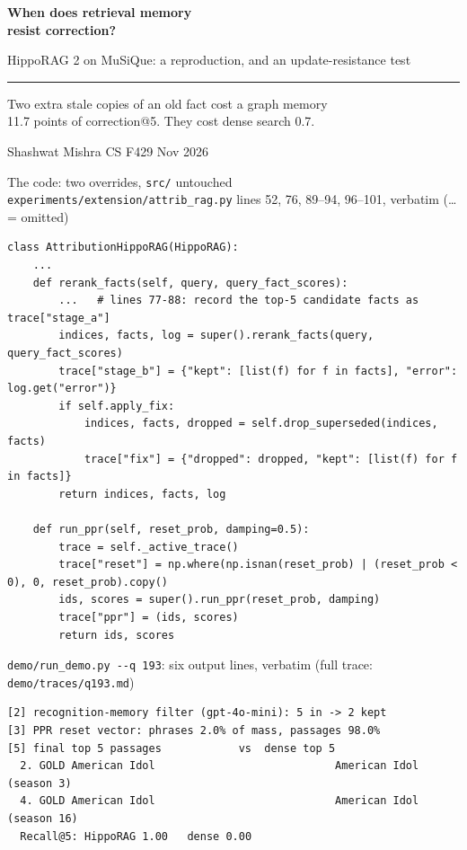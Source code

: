 \documentclass[aspectratio=169,12pt]{beamer}
\newcommand{\quiet}[1]{{\color{muted}\small #1}}
\begin{document}
\begin{frame}
\vspace{2.2em}
{\fontsize{26}{31}\selectfont\bfseries When does retrieval memory\\resist correction?}

\vspace{1.2em}
{\large HippoRAG 2 on MuSiQue: a reproduction, and an update-resistance test}

\vspace{1.6em}
\color{accent}\rule{3em}{0.25em}\color{ink}

\vspace{0.8em}
Two extra stale copies of an old fact cost a graph memory\\
11.7 points of correction@5. They cost dense search 0.7.

\vspace{1.4em}
\quiet{Shashwat Mishra \quad CS F429  Nov 2026}
\end{frame}

\begin{frame}[fragile]{The code: two overrides, \texttt{src/} untouched}
\vspace{-0.4em}
{\color{muted}\scriptsize \texttt{experiments/extension/attrib\_rag.py} lines 52, 76, 89--94, 96--101, verbatim (\ldots{} = omitted)}
\begin{Verbatim}[fontsize=\fontsize{6.2}{7.0}\selectfont]
class AttributionHippoRAG(HippoRAG):
    ...
    def rerank_facts(self, query, query_fact_scores):
        ...   # lines 77-88: record the top-5 candidate facts as trace["stage_a"]
        indices, facts, log = super().rerank_facts(query, query_fact_scores)
        trace["stage_b"] = {"kept": [list(f) for f in facts], "error": log.get("error")}
        if self.apply_fix:
            indices, facts, dropped = self.drop_superseded(indices, facts)
            trace["fix"] = {"dropped": dropped, "kept": [list(f) for f in facts]}
        return indices, facts, log

    def run_ppr(self, reset_prob, damping=0.5):
        trace = self._active_trace()
        trace["reset"] = np.where(np.isnan(reset_prob) | (reset_prob < 0), 0, reset_prob).copy()
        ids, scores = super().run_ppr(reset_prob, damping)
        trace["ppr"] = (ids, scores)
        return ids, scores
\end{Verbatim}
\vspace{-0.5em}
{\color{muted}\scriptsize \texttt{demo/run\_demo.py -{}-q 193}: six output lines, verbatim (full trace: \texttt{demo/traces/q193.md})}
\begin{Verbatim}[fontsize=\fontsize{6.2}{7.0}\selectfont]
[2] recognition-memory filter (gpt-4o-mini): 5 in -> 2 kept
[3] PPR reset vector: phrases 2.0% of mass, passages 98.0%
[5] final top 5 passages            vs  dense top 5
  2. GOLD American Idol                            American Idol (season 3)
  4. GOLD American Idol                            American Idol (season 16)
  Recall@5: HippoRAG 1.00   dense 0.00
\end{Verbatim}
\end{frame}
\end{document}
